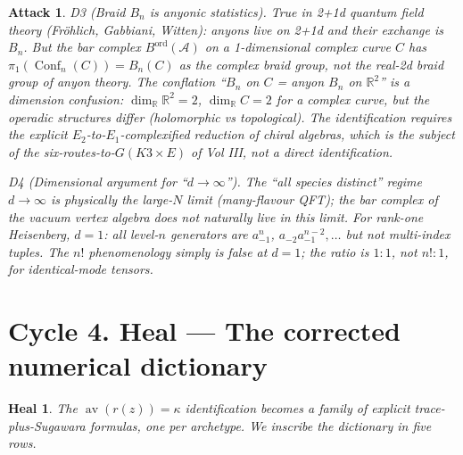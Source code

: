 \documentclass[11pt]{article}
\newtheorem*{attack}{Attack}
\newtheorem*{heal}{Heal}
\theoremstyle{definition}
\DeclareMathOperator{\Conf}{Conf}
\DeclareMathOperator{\av}{av}
\newcommand{\ord}{\mathrm{ord}}
\begin{document}
\begin{attack}
\emph{D3 (Braid $B_n$ is anyonic statistics).} True in 2+1d quantum
field theory (Fröhlich, Gabbiani, Witten): anyons live on 2+1d
and their exchange is $B_n$. But the bar complex $B^{\ord}(\mathcal A)$ on a
1-dimensional complex curve $C$ has $\pi_1(\Conf_n(C)) = B_n(C)$ as
the \emph{complex} braid group, not the real-2d braid group of anyon
theory. The conflation ``$B_n$ on $C$ = anyon $B_n$ on $\mathbb R^2$''
is a dimension confusion: $\dim_{\mathbb R}\mathbb R^2 = 2$,
$\dim_{\mathbb R} C = 2$ for a complex curve, but the operadic
structures differ (holomorphic vs topological). The identification
requires the explicit $E_2$-to-$E_1$-complexified reduction of
chiral algebras, which is the subject of the six-routes-to-$G(K3\times E)$
of Vol III, not a direct identification.

\emph{D4 (Dimensional argument for ``$d \to \infty$'').} The ``all species
distinct'' regime $d \to \infty$ is physically the large-$N$ limit
(many-flavour QFT); the bar complex of the vacuum vertex algebra
does not naturally live in this limit. For rank-one Heisenberg,
$d = 1$: all level-$n$ generators are $a_{-1}^n$, $a_{-2}a_{-1}^{n-2}, \dots$
but not multi-index tuples. The $n!$ phenomenology simply is false
at $d = 1$; the ratio is $1 : 1$, not $n! : 1$, for identical-mode
tensors.
\end{attack}

\section*{Cycle 4. Heal --- The corrected numerical dictionary}

\begin{heal}
The $\av(r(z)) = \kappa$ identification becomes a family of explicit
trace-plus-Sugawara formulas, one per archetype. We inscribe the
dictionary in five rows.
\end{heal}
\end{document}
